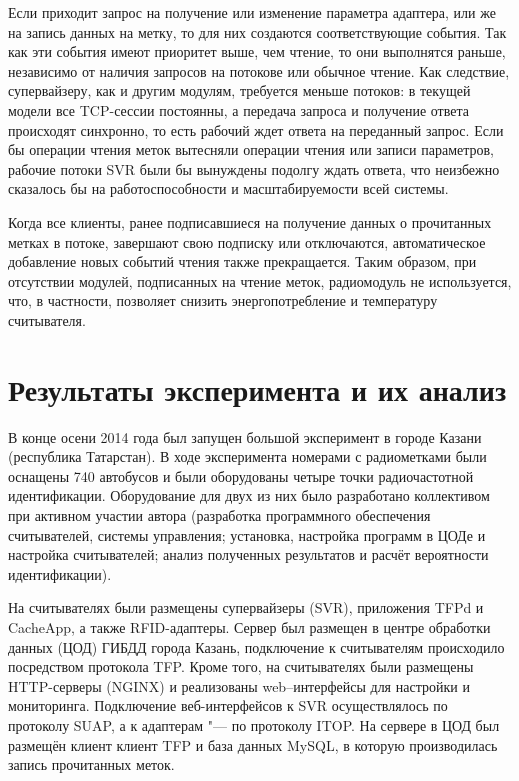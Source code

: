 Если приходит запрос на получение или изменение параметра адаптера, или же на запись данных на метку, то для них создаются соответствующие события. Так как эти события имеют приоритет выше, чем чтение, то они выполнятся раньше, независимо от наличия запросов на потокове или обычное чтение. Как следствие, супервайзеру, как и другим модулям, требуется меньше потоков: в текущей модели все TCP-сессии постоянны, а передача запроса и получение ответа происходят синхронно, то есть рабочий ждет ответа на переданный запрос. Если бы операции чтения меток вытесняли операции чтения или записи параметров, рабочие потоки SVR были бы вынуждены подолгу ждать ответа, что неизбежно сказалось бы на работоспособности и масштабируемости всей системы.

Когда все клиенты, ранее подписавшиеся на получение данных о прочитанных метках в потоке, завершают свою подписку или отключаются, автоматическое добавление новых событий чтения также прекращается. Таким образом, при отсутствии модулей, подписанных на чтение меток, радиомодуль не используется, что, в частности, позволяет снизить энергопотребление и температуру считывателя.



\section{Результаты эксперимента и их анализ}\label{sec:ch5_results}

В конце осени 2014 года был запущен большой эксперимент в городе Казани (республика Татарстан). В ходе эксперимента номерами с радиометками были оснащены 740 автобусов и были оборудованы четыре точки радиочастотной идентификации. Оборудование для двух из них было разработано коллективом при активном участии автора (разработка программного обеспечения считывателей, системы управления; установка, настройка программ в ЦОДе и настройка считывателей; анализ полученных результатов и расчёт вероятности идентификации).


На считывателях были размещены супервайзеры (SVR), приложения TFPd и CacheApp, а также RFID-адаптеры. Сервер был размещен в центре обработки данных (ЦОД) ГИБДД города Казань, подключение к считывателям происходило посредством протокола TFP. Кроме того, на считывателях были размещены HTTP-серверы (NGINX) и реализованы web--интерфейсы для настройки и мониторинга. Подключение веб-интерфейсов к SVR осуществлялось по протоколу SUAP, а к адаптерам "--- по протоколу ITOP. На сервере в ЦОД был размещён клиент клиент TFP и база данных MySQL, в которую производилась запись прочитанных меток.

